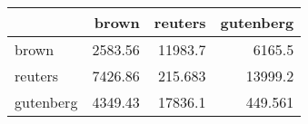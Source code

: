 \begin{tabular}{lrrr}
\hline
           &   brown &   reuters &   gutenberg \\
\hline
 brown     & 2583.56 & 11983.7   &    6165.5   \\
 reuters   & 7426.86 &   215.683 &   13999.2   \\
 gutenberg & 4349.43 & 17836.1   &     449.561 \\
\hline
\end{tabular}